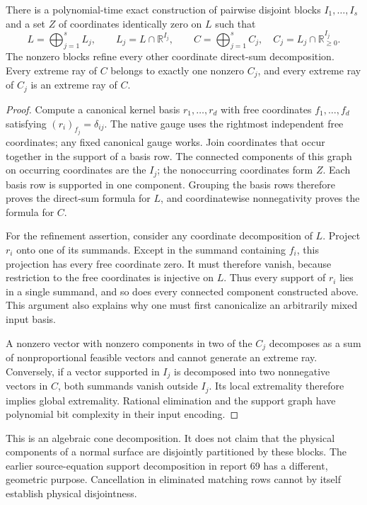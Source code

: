 \begin{theorem}
\label{sec:sector-coordinate-theorem}
There is a polynomial-time exact construction of pairwise disjoint blocks
$I_1,\ldots,I_s$ and a set $Z$ of coordinates identically zero on $L$ such that
\[
 L=\bigoplus_{j=1}^s L_j,\qquad
 L_j=L\cap\mathbb R^{I_j},\qquad
 C=\bigoplus_{j=1}^s C_j,\quad C_j=L_j\cap\mathbb R_{\geq0}^{I_j}.
\]
The nonzero blocks refine every other coordinate direct-sum decomposition.
Every extreme ray of $C$ belongs to exactly one nonzero $C_j$, and every
extreme ray of $C_j$ is an extreme ray of $C$.
\end{theorem}
\begin{proof}
Compute a canonical kernel basis $r_1,\ldots,r_d$ with free coordinates
$f_1,\ldots,f_d$ satisfying $(r_i)_{f_j}=\delta_{ij}$.  The native gauge uses
the rightmost independent free coordinates; any fixed canonical gauge works.
Join coordinates that occur together in the support of a basis row.  The
connected components of this graph on occurring coordinates are the $I_j$;
the nonoccurring coordinates form $Z$.  Each basis row is supported in one
component.  Grouping the basis rows therefore proves the direct-sum formula
for $L$, and coordinatewise nonnegativity proves the formula for $C$.

For the refinement assertion, consider any coordinate decomposition of $L$.
Project $r_i$ onto one of its summands.  Except in the summand containing
$f_i$, this projection has every free coordinate zero.  It must therefore
vanish, because restriction to the free coordinates is injective on $L$.
Thus every support of $r_i$ lies in a single summand, and so does every
connected component constructed above.  This argument also explains why
one must first canonicalize an arbitrarily mixed input basis.

A nonzero vector with nonzero components in two of the $C_j$ decomposes as
a sum of nonproportional feasible vectors and cannot generate an extreme
ray.  Conversely, if a vector supported in $I_j$ is decomposed into two
nonnegative vectors in $C$, both summands vanish outside $I_j$.  Its local
extremality therefore implies global extremality.  Rational elimination and
the support graph have polynomial bit complexity in their input encoding.
\end{proof}

This is an algebraic cone decomposition.  It does not claim that the
physical components of a normal surface are disjointly partitioned by these
blocks.  The earlier source-equation support decomposition in report 69 has
a different, geometric purpose.  Cancellation in eliminated matching rows
cannot by itself establish physical disjointness.

